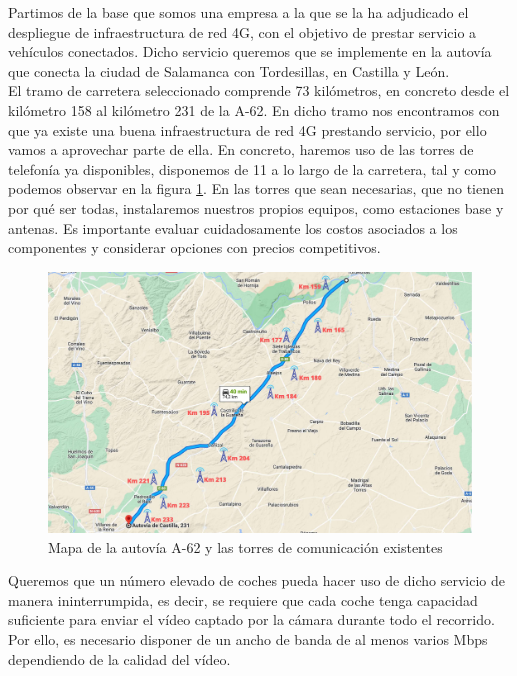 Partimos de la base que somos una empresa a la que se la ha adjudicado el despliegue de infraestructura de red 4G, con el objetivo de prestar servicio a vehículos conectados. Dicho servicio queremos que se implemente en la autovía que conecta la ciudad de Salamanca con Tordesillas, en Castilla y León. \\

El tramo de carretera seleccionado comprende 73 kilómetros, en concreto desde el kilómetro 158 al kilómetro 231 de la A-62. En dicho tramo nos encontramos con que ya existe una buena infraestructura de red 4G prestando servicio, por ello vamos a aprovechar parte de ella. En concreto, haremos uso de las torres de telefonía ya disponibles, disponemos de 11 a lo largo de la carretera, tal y como podemos observar en la figura \ref{autovia}. En las torres que sean necesarias, que no tienen por qué ser todas, instalaremos nuestros propios equipos, como estaciones base y antenas. Es importante evaluar cuidadosamente los costos asociados a los componentes y considerar opciones con precios competitivos. \\


\begin{figure}[H]
    \centering
 	\includegraphics[width=\textwidth]{Imagenes/PlanteamientoInicial/torres_telefonia.pdf}
    \caption{Mapa de la autovía A-62 y las torres de comunicación existentes }
    \label{autovia}
\end{figure}

Queremos que un número elevado de coches pueda hacer uso de dicho servicio de manera ininterrumpida, es decir, se requiere que cada coche tenga capacidad suficiente para enviar el vídeo captado por la cámara durante todo el recorrido. Por ello, es necesario disponer de un ancho de banda de al menos varios Mbps dependiendo de la calidad del vídeo. \\


